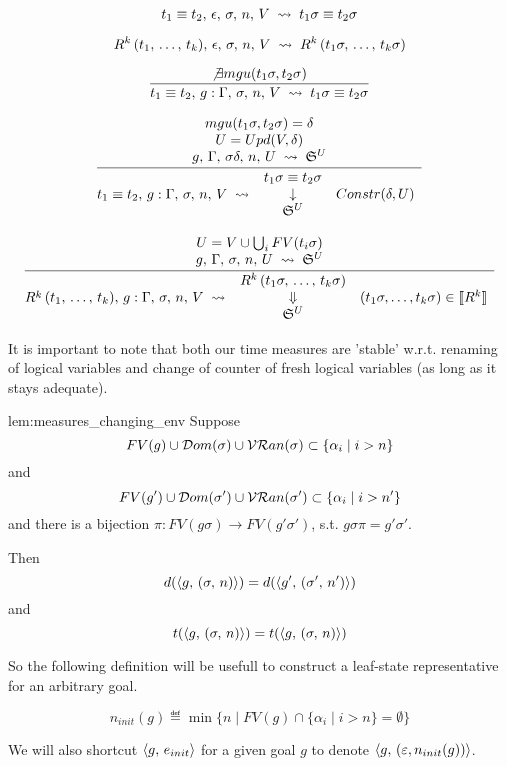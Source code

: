 \[ t_1 \equiv t_2, \, \epsilon, \, \sigma, \, n, \, V \; \rightsquigarrow \; t_1 \sigma \equiv t_2 \sigma \]

\[ R^k\,(t_1, \, \dots, \, t_k), \, \epsilon, \, \sigma, \, n, \, V \; \rightsquigarrow \; R^k\,(t_1 \sigma, \, \dots, \, t_k \sigma) \]
		
\[ \frac{  \not\exists mgu(t_1 \sigma, t_2 \sigma)  }{  t_1 \equiv t_2, \, g : \Gamma, \, \sigma, \, n, \, V \; \rightsquigarrow \; t_1 \sigma \equiv t_2 \sigma } \]

\[ \frac{\begin{array}{c}   mgu(t_1 \sigma, t_2 \sigma) = \delta   \\   U = Upd(V, \delta)   \\   g, \, \Gamma, \, \sigma \delta, \, n, \, U \; \rightsquigarrow \; \mathfrak{S}^{U}   \end{array}}{  t_1 \equiv t_2, \, g : \Gamma, \, \sigma, \, n, \, V \; \rightsquigarrow \; \begin{array}{cl} t_1 \sigma \equiv t_2 \sigma \\ \downarrow & Constr(\delta, U) \\ \mathfrak{S}^{U} \end{array}   } \]
		
\[ \frac{\begin{array}{c}   U =  V \cup \bigcup_{i} FV(t_i \sigma)  \\   g, \, \Gamma, \, \sigma, \, n, \, U \; \rightsquigarrow \; \mathfrak{S}^{U}   \end{array}}{  R^k\,(t_1, \, \dots, \, t_k), \, g : \Gamma, \, \sigma, \, n, \, V \; \rightsquigarrow \;  \begin{array}{cl} R^k\,(t_1 \sigma, \, \dots, \, t_k \sigma) \\ \Downarrow &  (t_1 \sigma, \dots, t_k \sigma) \in \llbracket R^k \rrbracket   \\ \mathfrak{S}^{U} \end{array}   } \]

It is important to note that both our time measures are 'stable' w.r.t. renaming of logical variables and change of counter of fresh logical variables (as long as it stays adequate).

\begin{replemma}{lem:measures_changing_env}
Suppose \[ FV(g) \cup \mathcal{D}om(\sigma) \cup \mathcal{VR}an(\sigma) \subset \{ \alpha_i \mid i > n \} \]
and \[ FV(g') \cup \mathcal{D}om(\sigma') \cup \mathcal{VR}an(\sigma') \subset \{ \alpha_i \mid i > n' \} \]
and there is a bijection $\pi \colon FV(g \sigma) \to FV(g' \sigma')$, s.t. $g \sigma \pi = g' \sigma'$.

Then \[ d(\langle g ,\, (\sigma ,\, n) \rangle) = d(\langle g' ,\, (\sigma' ,\, n') \rangle) \] and \[ t(\langle g ,\, (\sigma ,\, n) \rangle) = t(\langle g ,\, (\sigma ,\, n) \rangle) \] 
\end{replemma}

So the following definition will be usefull to construct a leaf-state representative for an arbitrary goal.

\begin{definition}
\[ n_{init}(g) \eqdef \min \{ n \mid FV(g) \cap \{ \alpha_i \mid i > n \} = \emptyset \} \]

We will also shortcut $\langle g ,\, e_{init} \rangle$ for a given goal $g$ to denote $\langle g ,\, (\varepsilon, n_{init}(g)) \rangle$. 
\end{definition}
		
